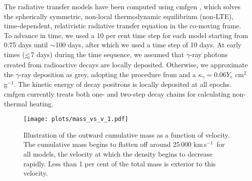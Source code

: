 \documentclass[useAMS,usenatbib,useasmath]{mnras}
\newcommand{\kms}{\hbox{km$\,$s$^{-1}$}}
\def\lesssim{\mathrel{\hbox{\rlap{\hbox{\lower4pt\hbox{$\sim$}}}\hbox{$<$}}}}
\newcommand{\cmfgen}{\sc cmfgen}
\begin{document}
The radiative transfer models have been computed using {\cmfgen} \citep{Hillier1998,Hillier2012,Dessart2014a,Dessart2014b}, which solves the spherically symmetric, non-local thermodynamic equilibrium (non-LTE), time-dependent, relativistic radiative transfer equation in the co-moving frame. To advance in time, we used a 10 per cent time step for each model starting from 0.75 days until $\sim$100 days, after which we used a time step of 10 days. At early times ($\lesssim$7 days) during the time sequence, we assumed that $\gamma$-ray photons created from radioactive decays are locally deposited. Otherwise, we approximate the $\gamma$-ray deposition as grey, adopting the procedure from \cite{Swartz1995} and a $\kappa_\gamma=0.06Y_e$ cm$^2$ g$^{-1}$. The kinetic energy of decay positrons is locally deposited at all epochs. {\cmfgen} currently treats both one- and two-step decay chains for calculating non-thermal heating. 

\begin{figure} 
\centering
\texttt{[image: plots/mass\_vs\_v\_1.pdf]}
\caption[]{Illustration of the outward cumulative mass as a function of velocity. The cumulative mass begins to flatten off around 25\,000 \kms\ for all models, the velocity at which the density begins to decrease rapidly. Less than 1 per cent of the total mass is exterior to this velocity.}
\label{mass_vs_v}
\end{figure}
\end{document}
